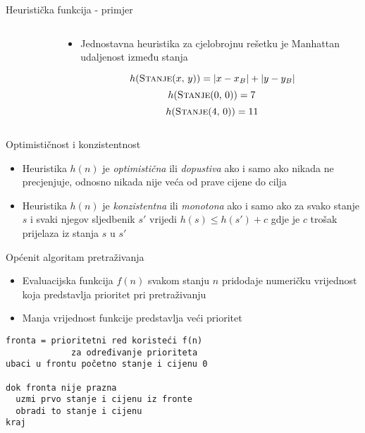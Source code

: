 \documentclass{beamer}
\newcommand{\twocolumns}[2]{
	\begin{columns}
		\begin{column}{0.4\textwidth}
			#1
		\end{column}
		\begin{column}{0.6\textwidth}  %
			#2
		\end{column}
	\end{columns}
}
\newcommand{\state}[2]{\textsc{Stanje}(\( #1 \), \( #2 \))}
\begin{document}
  \begin{frame}{Heuristička funkcija - primjer}
    \twocolumns{
    	\begin{figure}[H]
    		\begin{tikzpicture}
    		
    		\end{tikzpicture}
    	\end{figure}
    }{
    	\begin{itemize}
    		\item Jednostavna heuristika za cjelobrojnu rešetku je Manhattan udaljenost između stanja \\[0.5cm]
    	\end{itemize}
    	\[ h(\text{\state{x}{y}}) = |x - x_B| + |y - y_B| \]
    	\[ h(\text{\state{0}{0}}) = 7 \]
    	\[ h(\text{\state{4}{0}}) = 11 \]
    }
  \end{frame}

  \begin{frame}{Optimističnost i konzistentnost}
  	\begin{itemize}
  		\item Heuristika \( h(n) \) je \emph{optimistična} ili \emph{dopustiva} ako i samo ako nikada ne precjenjuje, odnosno nikada nije veća od prave cijene do cilja \\[3em]
  		\item Heuristika \( h(n) \) je \emph{konzistentna} ili \emph{monotona} ako i samo ako za svako stanje \( s \) i svaki njegov sljedbenik \( s' \) vrijedi \( h(s) \leq h(s') + c \) gdje je \( c \) trošak prijelaza iz stanja \( s \) u \( s' \)
  	\end{itemize}
  \end{frame}

  \begin{frame}[fragile]{Općenit algoritam pretraživanja}
  	\begin{itemize}
  		\item Evaluacijska funkcija \( f(n) \) svakom stanju \( n \) pridodaje numeričku vrijednost koja predstavlja prioritet pri pretraživanju
  		\item Manja vrijednost funkcije predstavlja veći prioritet
  	\end{itemize}
  
  	\begin{verbatim}
fronta = prioritetni red koristeći f(n)
             za određivanje prioriteta
ubaci u frontu početno stanje i cijenu 0

dok fronta nije prazna
  uzmi prvo stanje i cijenu iz fronte
  obradi to stanje i cijenu
kraj\end{verbatim}
  \end{frame}
\end{document}
